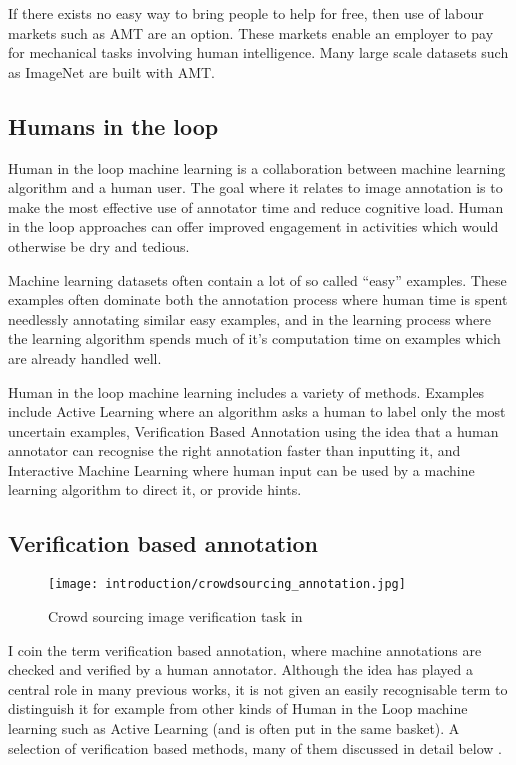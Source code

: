 If there exists no easy way to bring people to help for free, then use of labour markets such as \gls{AMT} are an option. These markets enable an employer to pay for mechanical tasks involving human intelligence. Many large scale datasets such as ImageNet \cite{Russakovsky2015} are built with \gls{AMT}. 


\subsection{Humans in the loop}

Human in the loop machine learning is a collaboration between machine learning algorithm and a human user. The goal where it relates to image annotation is to make the most effective use of annotator time and reduce cognitive load. Human in the loop approaches can offer improved engagement in activities which would otherwise be dry and tedious.

Machine learning datasets often contain a lot of so called ``easy'' examples. These examples often dominate both the annotation process where human time is spent needlessly annotating similar easy examples, and in the learning process where the learning algorithm spends much of it's computation time on examples which are already handled well. 

Human in the loop machine learning includes a variety of methods. Examples include Active Learning where an algorithm asks a human to label only the most uncertain examples, Verification Based Annotation using the idea that a human annotator can recognise the right annotation faster than inputting it, and Interactive Machine Learning where human input can be used by a machine learning algorithm to direct it, or provide hints. 

\subsection{Verification based annotation}

\begin{figure}[h]
  \centering
  \texttt{[image: introduction/crowdsourcing\_annotation.jpg]}
  \caption{Crowd sourcing image verification task in \cite{Su2012a}} 
  \label{fig:crowdsourcing}
\end{figure}

I coin the term verification based annotation, where machine annotations are checked and verified by a human annotator. Although the idea has played a central role in many previous works, it is not given an easily recognisable term to distinguish it for example from other kinds of Human in the Loop machine learning such as Active Learning (and is often put in the same basket). A selection of verification based methods, many of them discussed in detail below \cite{Yao2012, McNeill2011, Adhikaria2018, Castrejon2017, Papadopoulos2016, Russakovsky2015a}. 

